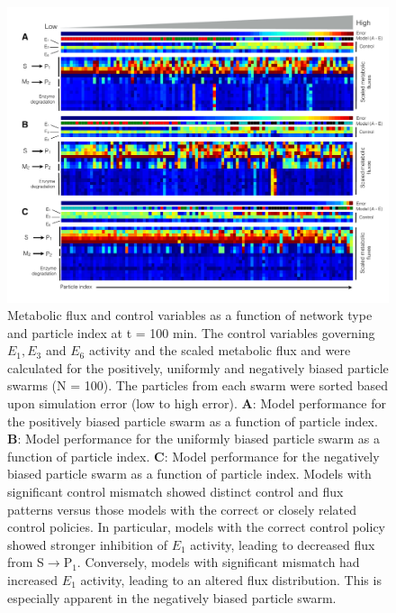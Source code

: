 \documentclass[12pt]{article}
\begin{document}
\clearpage

\begin{figure}
\centering
\includegraphics[width=1.0\textwidth,height=0.6\textheight]{./figs/Figure-8-Flux.pdf}
\caption{Metabolic flux and control variables as a function of network type and particle index at t = 100 min.
The control variables governing $E_{1},E_{3}$ and $E_{6}$ activity and the scaled metabolic flux and were calculated for the positively, 
uniformly and negatively biased particle swarms (N = 100). The particles from each swarm were sorted based upon simulation error (low to high error). 
\textbf{A}: Model performance for the positively biased particle swarm as a function of particle index.
\textbf{B}: Model performance for the uniformly biased particle swarm as a function of particle index.
\textbf{C}: Model performance for the negatively biased particle swarm as a function of particle index. 
Models with significant control mismatch showed distinct control and flux patterns versus those models with the correct or closely related control policies.
In particular, models with the correct control policy showed stronger inhibition of $E_{1}$ activity, leading to decreased flux from S$\rightarrow$P$_{1}$.
Conversely, models with significant mismatch had increased $E_{1}$ activity, leading to an altered flux distribution. 
This is especially apparent in the negatively biased particle swarm. 
}\label{fig-flux-pattern}
\end{figure}

\clearpage

\renewcommand\thefigure{S\arabic{figure}}
\renewcommand\thetable{T\arabic{table}}
\renewcommand\thepage{S-\arabic{page}}
\renewcommand\theequation{S\arabic{equation}}

\setcounter{equation}{0}
\setcounter{table}{0}
\setcounter{figure}{0}
\setcounter{page}{1}
\end{document}
